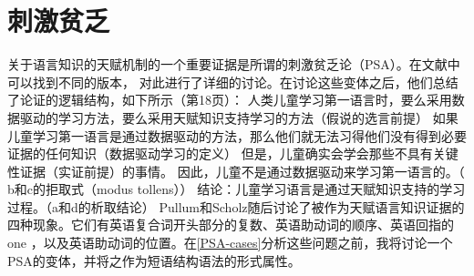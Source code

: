 \section{刺激贫乏}
\label{Abschnitt-PSA}

关于语言知识的天赋机制的一个重要证据是所谓的刺激贫乏论（PSA）\citep[]{Chomsky80b-u}。在文献中可以找到不同的版本， \citet{PS2002a}对此进行了详细的讨论。在讨论这些变体之后，他们总结了论证的逻辑结构，如下所示（第18页）：
\eal
\ex 人类儿童学习第一语言时，要么采用数据驱动的学习方法，要么采用天赋知识支持学习的方法（假说的选言前提）
\ex 如果儿童学习第一语言是通过数据驱动的方法，那么他们就无法习得他们没有得到必要证据的任何知识（数据驱动学习的定义）
\ex 但是，儿童确实会学会那些不具有关键性证据（实证前提）的事情。
\ex 因此，儿童不是通过数据驱动来学习第一语言的。（ b和c的拒取式（modus tollens）） 
\ex 结论：儿童学习语言是通过天赋知识支持的学习过程。（a和d的析取结论）
\zl
Pullum和Scholz随后讨论了被作为天赋语言知识证据的四种现象。它们有英语复合词开头部分的复数\citep{Gordon86a}、英语助动词的顺序\citep{Kimball73b-u}、英语回指的one\citep{Baker78a-u} ，以及英语助动词的位置\citep[--33]{Chomsky71a-u}。在\ref{PSA-cases}分析这些问题之前，我将讨论一个PSA的变体，并将之作为短语结构语法的形式属性。

